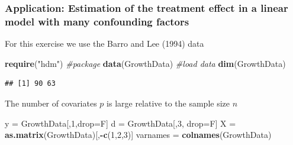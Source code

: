 \documentclass[
  shownotes,
  xcolor={svgnames},
  hyperref={colorlinks,citecolor=DarkBlue,linkcolor=DarkRed,urlcolor=DarkBlue}
  , aspectratio=169]{beamer}
\newenvironment{Shaded}{\begin{snugshade}}{\end{snugshade}}
\newcommand{\CommentTok}[1]{\textcolor[rgb]{0.56,0.35,0.01}{\textit{#1}}}
\newcommand{\DecValTok}[1]{\textcolor[rgb]{0.00,0.00,0.81}{#1}}
\newcommand{\KeywordTok}[1]{\textcolor[rgb]{0.13,0.29,0.53}{\textbf{#1}}}
\newcommand{\NormalTok}[1]{#1}
\newcommand{\OperatorTok}[1]{\textcolor[rgb]{0.81,0.36,0.00}{\textbf{#1}}}
\newcommand{\StringTok}[1]{\textcolor[rgb]{0.31,0.60,0.02}{#1}}
\begin{document}
\begin{frame}[fragile]
\frametitle{Application: Estimation of the treatment effect in a linear model with many confounding factors}
For this exercise we use the Barro and Lee (1994) data


\begin{Shaded}
\begin{Highlighting}[]
\KeywordTok{require}\NormalTok{(}\StringTok{"hdm"}\NormalTok{) }\CommentTok{\#package}
\KeywordTok{data}\NormalTok{(GrowthData) }\CommentTok{\#load data}
\KeywordTok{dim}\NormalTok{(GrowthData)}
\end{Highlighting}
\end{Shaded}

\begin{verbatim}
## [1] 90 63
\end{verbatim}

The number of covariates \(p\) is large relative to the sample size \(n\)

\begin{Shaded}
\begin{Highlighting}[]
\NormalTok{y =}\StringTok{ }\NormalTok{GrowthData[,}\DecValTok{1}\NormalTok{,drop=F]}
\NormalTok{d =}\StringTok{ }\NormalTok{GrowthData[,}\DecValTok{3}\NormalTok{, drop=F]}
\NormalTok{X =}\StringTok{ }\KeywordTok{as.matrix}\NormalTok{(GrowthData)[,}\OperatorTok{{-}}\KeywordTok{c}\NormalTok{(}\DecValTok{1}\NormalTok{,}\DecValTok{2}\NormalTok{,}\DecValTok{3}\NormalTok{)]}
\NormalTok{varnames =}\StringTok{ }\KeywordTok{colnames}\NormalTok{(GrowthData)}
\end{Highlighting}
\end{Shaded}

\end{frame}
\end{document}
